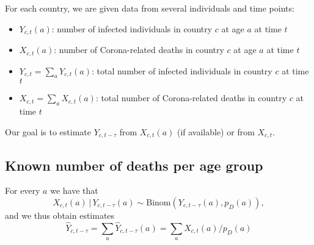 \documentclass[a4paper]{article}
\renewcommand\P{\mathbb{P}}
\newcommand{\given}{\, \vert \,}
\begin{document}
{For each country, we are given data from several individuals and time points:

\begin{itemize}
\item $Y_{c,t}(a)$: number of infected individuals in country $c$ at age $a$ at time $t$
\item $X_{c,t}(a)$: number of Corona-related deaths in country $c$ at age $a$ at time $t$
\item $Y_{c,t} = \sum_a Y_{c,t}(a)$: total number of infected individuals in country $c$ at time $t$
\item $X_{c,t} = \sum_a X_{c,t}(a)$: total number of Corona-related deaths in country $c$ at time $t$
\end{itemize}
%
Our goal is to estimate $Y_{c,t-\tau}$ from $X_{c,t}(a)$ (if available) or from $X_{c,t}$. 

\subsection{Known number of deaths per age group}
%
For every $a$ we have that 
$$X_{c,t}(a) \given Y_{c,t-\tau}(a) \sim \text{Binom}(Y_{c,t-\tau}(a), p_D(a)),$$
and we thus obtain estimates 
$$\hat{Y}_{c,t-\tau} = \sum_a \hat{Y}_{c,t-\tau}(a) =\sum_a  X_{c,t}(a) / p_D(a)$$

}
\end{document}
